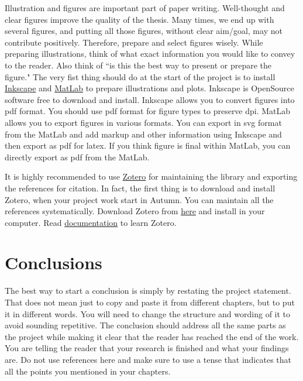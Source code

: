 \documentclass[subscriptcorrection,upint,varvw,mathalfa=cal=euler,barcolor=black,balance,hyphenate,french,pdf-a,nolists]{asmejour}
\begin{document}
Illustration and figures are important part of paper writing. Well-thought and clear figures improve the quality of the thesis. Many times, we end up with several figures, and putting all those figures, without clear aim/goal, may not contribute positively. Therefore, prepare and select figures wisely. While preparing illustrations, think of what exact information you would like to convey to the reader. Also think of ``is this the best way to present or prepare the figure." The very fist thing should do at the start of the project is to install \href{https://inkscape.org/}{Inkscape} and \href{https://www.mathworks.com/products/matlab.html}{MatLab} to prepare illustrations and plots. Inkscape is OpenSource software free to download and install. Inkscape allows you to convert figures into pdf format. You should use pdf format for figure types to preserve dpi. MatLab allows you to export figures in various formats. You can export in svg format from the MatLab and add markup and other information using Inkscape and then export as pdf for latex. If you think figure is final within MatLab, you can directly export as pdf from the MatLab.
    
It is highly recommended to use \href{https://www.zotero.org/}{Zotero} for maintaining the library and exporting the references for citation. In fact, the first thing is to download and install Zotero, when your project work start in Autumn. You can maintain all the references systematically. Download Zotero from \href{https://www.zotero.org/download}{here} and install in your computer. Read \href{https://www.zotero.org/support/}{documentation} to learn Zotero.

\section{Conclusions}
\label{sec:4}
The best way to start a conclusion is simply by restating the project statement. That does not mean just to copy and paste it from different chapters, but to put it in different words. You will need to change the structure and wording of it to avoid sounding repetitive. The conclusion should address all the same parts as the project while making it clear that the reader has reached the end of the work. You are telling the reader that your research is finished and what your findings are. Do not use references here and make sure to use a tense that indicates that all the points you mentioned in your chapters.
\end{document}

